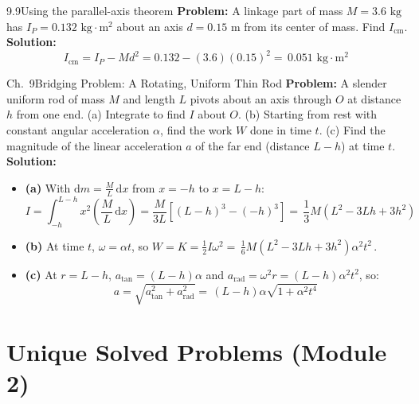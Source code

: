 \documentclass[11pt,a4paper,openany,oneside]{book}
\newcommand{\eqbox}[1]{\boxed{\,#1\,}}
\newcommand{\dd}{\,\mathrm{d}}
\newcommand{\diff}{\mathrm{d}}
\numberwithin{equation}{chapter}
\newcommand{\bk}[1]{\texorpdfstring{\enspace{\normalfont\small\color{slate}[Book #1]}}{ [Book #1]}}
\begin{document}
\begin{example}{9.9}{Using the parallel-axis theorem\bk{p.\ 294}}
\textbf{Problem:} A linkage part of mass $M = 3.6\text{ kg}$ has $I_P = 0.132\text{ kg}\cdot\text{m}^2$ about an axis $d = 0.15\text{ m}$ from its center of mass. Find $I_{\text{cm}}$.
\tcblower
\textbf{Solution:}
\begin{equation*}
  I_{\text{cm}} = I_P - Md^2 = 0.132 - (3.6)(0.15)^2 = \eqbox{0.051\text{ kg}\cdot\text{m}^2}
\end{equation*}
\end{example}

\begin{example}{Ch.\ 9}{Bridging Problem: A Rotating, Uniform Thin Rod\bk{p.\ 298, 307}}
\textbf{Problem:} A slender uniform rod of mass $M$ and length $L$ pivots about an axis through $O$ at distance $h$ from one end. (a) Integrate to find $I$ about $O$. (b) Starting from rest with constant angular acceleration $\alpha$, find the work $W$ done in time $t$. (c) Find the magnitude of the linear acceleration $a$ of the far end (distance $L-h$) at time $t$.
\tcblower
\textbf{Solution:}
\begin{itemize}
  \item \textbf{(a)} With $\diff m = \frac{M}{L}\dd x$ from $x = -h$ to $x = L-h$:
  \begin{equation*}
    I = \int_{-h}^{L-h} x^2\!\left(\frac{M}{L}\dd x\right) = \frac{M}{3L}\!\left[(L-h)^3 - (-h)^3\right] = \eqbox{\frac{1}{3}M(L^2 - 3Lh + 3h^2)}
  \end{equation*}
  \item \textbf{(b)} At time $t$, $\omega = \alpha t$, so $W = K = \frac{1}{2}I\omega^2 = \eqbox{\frac{1}{6}M(L^2 - 3Lh + 3h^2)\alpha^2 t^2}$.
  \item \textbf{(c)} At $r = L-h$, $a_{\text{tan}} = (L-h)\alpha$ and $a_{\text{rad}} = \omega^2 r = (L-h)\alpha^2 t^2$, so:
  \begin{equation*}
    a = \sqrt{a_{\text{tan}}^2 + a_{\text{rad}}^2} = \eqbox{(L-h)\alpha\sqrt{1 + \alpha^2 t^4}}
  \end{equation*}
\end{itemize}
\end{example}

\section{Unique Solved Problems (Module 2)}
\end{document}
